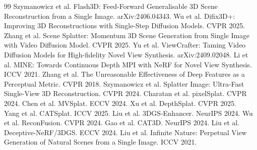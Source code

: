 \documentclass[10pt,twocolumn,letterpaper]{article}
\begin{document}

\begin{thebibliography}{99}
 Szymanowicz et al. Flash3D: Feed-Forward Generalisable 3D Scene Reconstruction from a Single Image. arXiv:2406.04343.
 Wu et al. Difix3D+: Improving 3D Reconstructions with Single-Step Diffusion Models. CVPR 2025.
 Zhang et al. Scene Splatter: Momentum 3D Scene Generation from Single Image with Video Diffusion Model. CVPR 2025.
 Yu et al. ViewCrafter: Taming Video Diffusion Models for High-fidelity Novel View Synthesis. arXiv:2409.02048.
 Li et al. MINE: Towards Continuous Depth MPI with NeRF for Novel View Synthesis. ICCV 2021.
 Zhang et al. The Unreasonable Effectiveness of Deep Features as a Perceptual Metric. CVPR 2018.
 Szymanowicz et al. Splatter Image: Ultra-Fast Single-View 3D Reconstruction. CVPR 2024.
 Charatan et al. pixelSplat. CVPR 2024.
 Chen et al. MVSplat. ECCV 2024.
 Xu et al. DepthSplat. CVPR 2025.
 Yang et al. CATSplat. ICCV 2025.
 Liu et al. 3DGS-Enhancer. NeurIPS 2024.
 Wu et al. ReconFusion. CVPR 2024.
 Gao et al. CAT3D. NeurIPS 2024.
 Liu et al. Deceptive-NeRF/3DGS. ECCV 2024.
 Liu et al. Infinite Nature: Perpetual View Generation of Natural Scenes from a Single Image. ICCV 2021.
\end{thebibliography}
\end{document}
